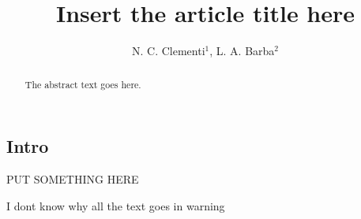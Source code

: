 \documentclass[openacc]{rstransa} %
\begin{document}
\title{Insert the article title here}

\author{%
N. C. Clementi$^{1}$, L. A. Barba$^{2}$}

\address{$^{1}$First author address\\
$^{2}$Second author address\\
$^{3}$Third author address}

\subject{xxxxx, xxxxx, xxxx}



\begin{abstract}
    The abstract text goes here. 
\end{abstract}
    
    
\begin{fmtext}   %
\section{Intro}

PUT SOMETHING HERE

\end{fmtext}

\maketitle
I dont know why all the text goes in warning
\end{document}

